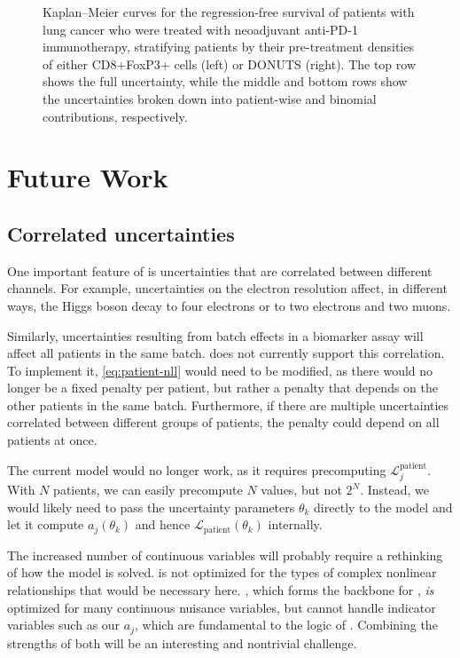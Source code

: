 \documentclass[article]{jss}
\newcommand{\KM}{Kaplan--Meier} %
\begin{document}
\begin{figure}[p]
\begin{subfigure}[t]{\figwidth}
    \caption{\label{fig:lung-dataset-donuts-binomial}}
  \end{subfigure}
  \caption{\label{fig:lung-dataset} \KM{} curves for the regression-free survival of patients with lung cancer who were treated with neoadjuvant anti-PD-1 immunotherapy, stratifying patients by their pre-treatment densities of either CD8+FoxP3+ cells (left) or DONUTS (right).  The top row shows the full uncertainty, while the middle and bottom rows show the uncertainties broken down into patient-wise and binomial contributions, respectively.}
\end{figure}

\section{Future Work}

\subsection{Correlated uncertainties}

One important feature of  is uncertainties that are correlated between different channels.  For example, uncertainties on the electron resolution affect, in different ways, the Higgs boson decay to four electrons or to two electrons and two muons.

Similarly, uncertainties resulting from batch effects in a biomarker assay will affect all patients in the same batch\@.   does not currently support this correlation.  To implement it, \cref{eq:patient-nll} would need to be modified, as there would no longer be a fixed penalty per patient, but rather a penalty that depends on the other patients in the same batch.  Furthermore, if there are multiple uncertainties correlated between different groups of patients, the penalty could depend on all patients at once.

The current  model would no longer work, as it requires precomputing \(\mathcal{L}_j^{\text{patient}}\).  With \(N\) patients, we can easily precompute \(N\) values, but not \(2^N\).  Instead, we would likely need to pass the uncertainty parameters \(\theta_k\) directly to the  model and let it compute \(a_j\left(\theta_k\right)\) and hence \(\mathcal{L}_{\text{patient}}\left(\theta_k\right)\) internally.

The increased number of continuous variables will probably require a rethinking of how the model is solved\@.   is not optimized for the types of complex nonlinear relationships that would be necessary here\@.   \citep{minuit}, which forms the backbone for , \emph{is} optimized for many continuous nuisance variables, but cannot handle indicator variables such as our \(a_j\), which are fundamental to the logic of .  Combining the strengths of both will be an interesting and nontrivial challenge.
\end{document}
